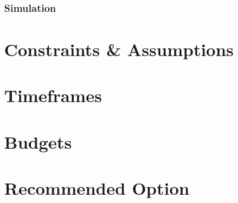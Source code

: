 \documentclass[a4paper]{article}
\begin{document}
\subsubsection{Simulation}

\section{Constraints \& Assumptions}

\section{Timeframes}

\section{Budgets}

\section{Recommended Option}
\end{document}
